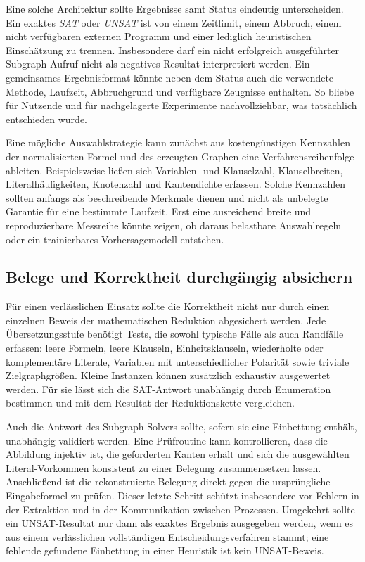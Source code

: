 \documentclass[a4paper,12pt]{article}
\theoremstyle{definition}
\begin{document}
Eine solche Architektur sollte Ergebnisse samt Status eindeutig unterscheiden. Ein exaktes \emph{SAT} oder \emph{UNSAT} ist von einem Zeitlimit, einem Abbruch, einem nicht verfügbaren externen Programm und einer lediglich heuristischen Einschätzung zu trennen. Insbesondere darf ein nicht erfolgreich ausgeführter Subgraph-Aufruf nicht als negatives Resultat interpretiert werden. Ein gemeinsames Ergebnisformat könnte neben dem Status auch die verwendete Methode, Laufzeit, Abbruchgrund und verfügbare Zeugnisse enthalten. So bliebe für Nutzende und für nachgelagerte Experimente nachvollziehbar, was tatsächlich entschieden wurde.

Eine mögliche Auswahlstrategie kann zunächst aus kostengünstigen Kennzahlen der normalisierten Formel und des erzeugten Graphen eine Verfahrensreihenfolge ableiten. Beispielsweise ließen sich Variablen- und Klauselzahl, Klauselbreiten, Literalhäufigkeiten, Knotenzahl und Kantendichte erfassen. Solche Kennzahlen sollten anfangs als beschreibende Merkmale dienen und nicht als unbelegte Garantie für eine bestimmte Laufzeit. Erst eine ausreichend breite und reproduzierbare Messreihe könnte zeigen, ob daraus belastbare Auswahlregeln oder ein trainierbares Vorhersagemodell entstehen.

\subsection{Belege und Korrektheit durchgängig absichern}
Für einen verlässlichen Einsatz sollte die Korrektheit nicht nur durch einen einzelnen Beweis der mathematischen Reduktion abgesichert werden. Jede Übersetzungsstufe benötigt Tests, die sowohl typische Fälle als auch Randfälle erfassen: leere Formeln, leere Klauseln, Einheitsklauseln, wiederholte oder komplementäre Literale, Variablen mit unterschiedlicher Polarität sowie triviale Zielgraphgrößen. Kleine Instanzen können zusätzlich exhaustiv ausgewertet werden. Für sie lässt sich die SAT-Antwort unabhängig durch Enumeration bestimmen und mit dem Resultat der Reduktionskette vergleichen.

Auch die Antwort des Subgraph-Solvers sollte, sofern sie eine Einbettung enthält, unabhängig validiert werden. Eine Prüfroutine kann kontrollieren, dass die Abbildung injektiv ist, die geforderten Kanten erhält und sich die ausgewählten Literal-Vorkommen konsistent zu einer Belegung zusammensetzen lassen. Anschließend ist die rekonstruierte Belegung direkt gegen die ursprüngliche Eingabeformel zu prüfen. Dieser letzte Schritt schützt insbesondere vor Fehlern in der Extraktion und in der Kommunikation zwischen Prozessen. Umgekehrt sollte ein UNSAT-Resultat nur dann als exaktes Ergebnis ausgegeben werden, wenn es aus einem verlässlichen vollständigen Entscheidungsverfahren stammt; eine fehlende gefundene Einbettung in einer Heuristik ist kein UNSAT-Beweis.
\end{document}
